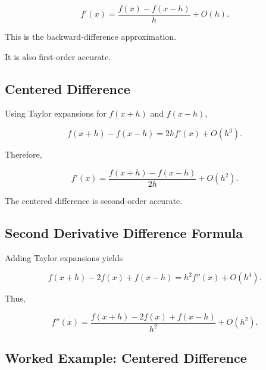 \[
\boxed{
f'(x)
=
\frac{
f(x)-f(x-h)
}{
h
}
+
O(h).
}
\]

This is the backward-difference approximation.

It is also first-order accurate.

\subsection{Centered Difference}
\label{subsec:centered-difference}

Using Taylor expansions for \(f(x+h)\) and \(f(x-h)\),

\[
f(x+h)
-
f(x-h)
=
2hf'(x)
+
O(h^3).
\]

Therefore,

\[
\boxed{
f'(x)
=
\frac{
f(x+h)-f(x-h)
}{
2h
}
+
O(h^2).
}
\]

The centered difference is second-order accurate.

\subsection{Second Derivative Difference Formula}
\label{subsec:second-derivative-difference}

Adding Taylor expansions yields

\[
f(x+h)
-
2f(x)
+
f(x-h)
=
h^2f''(x)
+
O(h^4).
\]

Thus,

\[
\boxed{
f''(x)
=
\frac{
f(x+h)
-
2f(x)
+
f(x-h)
}{
h^2
}
+
O(h^2).
}
\]

\subsection{Worked Example: Centered Difference}
\label{subsec:worked-centered-difference}

